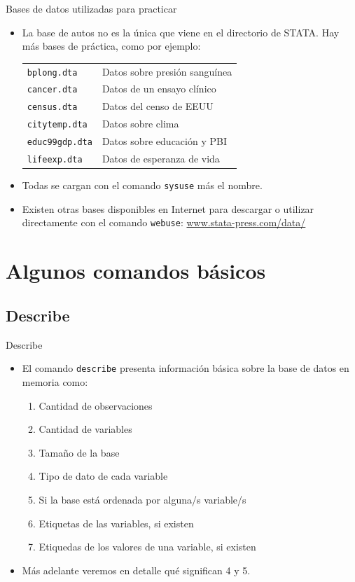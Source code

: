 \documentclass{beamer}
\begin{document}
\begin{frame}{Bases de datos utilizadas para practicar}
\begin{itemize}
\item La base de autos no es la única que viene en el directorio de STATA. Hay más bases de práctica, como por ejemplo: 
\smallskip
{\small
\begin{center}
\begin{tabular}{p{3cm} p{5cm}} \hline
\texttt{bplong.dta}& Datos sobre presión sanguínea\\
\texttt{cancer.dta} & Datos de un ensayo clínico\\
\texttt{census.dta}& Datos del censo de EEUU\\
\texttt{citytemp.dta}& Datos sobre clima\\
\texttt{educ99gdp.dta}& Datos sobre educación y PBI\\
\texttt{lifeexp.dta}& Datos de esperanza de vida\\\hline
\end{tabular}
\end{center}}
\smallskip
\item Todas se cargan con el comando \texttt{sysuse} más el nombre.
\item Existen otras bases disponibles en Internet para descargar o utilizar directamente con el comando \texttt{webuse}: \url{www.stata-press.com/data/}
\end{itemize}
\end{frame}

\section{Algunos comandos básicos}
\subsection{Describe}
\begin{frame}{Describe} 
\begin{itemize}
\item El comando \texttt{describe} presenta información básica sobre la base de datos en memoria como:
\begin{enumerate}
\item Cantidad de observaciones  
\item Cantidad de variables  
\item Tamaño de la base
\item Tipo de dato de cada variable
\item Si la base está ordenada por alguna/s variable/s
\item Etiquetas de las variables, si existen 
\item Etiquedas de los valores de una variable, si existen
\end{enumerate}
\item Más adelante veremos en detalle qué significan 4 y 5. 
\end{itemize}
\end{frame}
\end{document}
